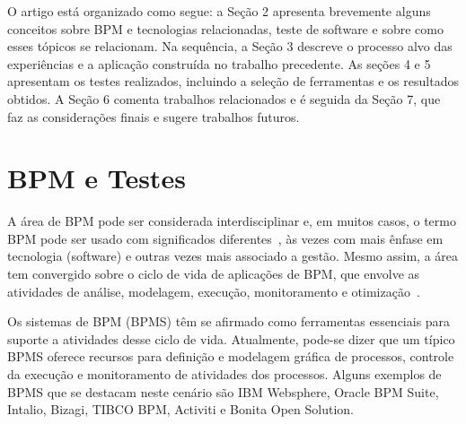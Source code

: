 \documentclass[12pt]{article}
\begin{document}
O artigo está organizado como segue: a Seção 2 apresenta brevemente alguns conceitos sobre BPM e tecnologias relacionadas, teste de software e sobre como esses tópicos se relacionam. Na sequência, a Seção 3 descreve o processo alvo das experiências e a aplicação construída no trabalho precedente. As seções 4 e 5 apresentam os testes realizados, incluindo a seleção de ferramentas e os resultados obtidos. A Seção 6 comenta trabalhos relacionados e é seguida da Seção 7, que faz as considerações finais e sugere trabalhos futuros.


\section{BPM e Testes}






A área de BPM pode ser considerada interdisciplinar e, em muitos casos, o termo BPM pode ser usado com significados diferentes~\cite{acmxrds2009}, às vezes com mais ênfase em tecnologia (software) e outras vezes mais associado a gestão. Mesmo assim, a área tem convergido sobre o ciclo de vida de aplicações de BPM, que envolve as atividades de análise, modelagem, execução, monitoramento e otimização~\cite{ABPMP}. 



Os sistemas de BPM (BPMS) têm se afirmado como ferramentas essenciais para suporte a atividades desse ciclo de vida. Atualmente, pode-se dizer que um típico BPMS oferece recursos para definição e modelagem gráfica de processos, controle da execução e monitoramento de atividades dos processos. Alguns exemplos de BPMS que se destacam neste cenário são IBM Websphere, Oracle BPM Suite, Intalio, Bizagi, TIBCO BPM, Activiti e Bonita Open Solution.
\end{document}
